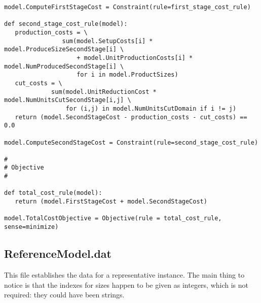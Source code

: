 {\begin{verbatim}
model.ComputeFirstStageCost = Constraint(rule=first_stage_cost_rule)

def second_stage_cost_rule(model):
   production_costs = \
                sum(model.SetupCosts[i] * model.ProduceSizeSecondStage[i] \
                    + model.UnitProductionCosts[i] * model.NumProducedSecondStage[i] \
                    for i in model.ProductSizes)
   cut_costs = \
             sum(model.UnitReductionCost * model.NumUnitsCutSecondStage[i,j] \
                 for (i,j) in model.NumUnitsCutDomain if i != j)
   return (model.SecondStageCost - production_costs - cut_costs) == 0.0    

model.ComputeSecondStageCost = Constraint(rule=second_stage_cost_rule)

#
# Objective
#

def total_cost_rule(model):
   return (model.FirstStageCost + model.SecondStageCost)

model.TotalCostObjective = Objective(rule = total_cost_rule, sense=minimize)
\end{verbatim}
}

\subsection{ReferenceModel.dat}

This file establishes the data for a representative instance. The main thing to notice is that the indexes for
sizes happen to be given as integers, which is not required: they could have been strings.


